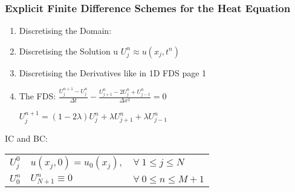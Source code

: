 \documentclass[8pt,a4paper]{scrartcl}
\begin{document}
\begin{multicols*}{3}
\subsubsection*{Explicit Finite Difference Schemes for the Heat Equation}

\begin{enumerate}
\ncompaq
\item Discretising the Domain:


\item Discretising the Solution u $U^n_j\approx u(x_j,t^n)$
\item Discretising the Derivatives like in 1D FDS page 1

\item The FDS: $\frac{U_j^{n+1}-U_j^n}{\Delta t}-\frac{U_{j+1}^n-2U_j^n+U_{j-1}^n}{\Delta x^2}=0$

 \dahe $U_j^{n+1}=(1-2\lambda)U_j^n+\lambda U_{j+1}^n+\lambda U_{j-1}^n$

\end{enumerate}

IC and BC:$\quad$
\begin{tabular}{l@{ = }ll}
$U_j^0$&$u(x_j,0)=u_0(x_j),$&$\forall\ 1\leq j\leq N$\\
$U_0^n$&$U_{N+1}^n\equiv 0$&$\forall\ 0\leq n\leq M+1$
\end{tabular}



%
%
%


\end{multicols*}
\end{document}
